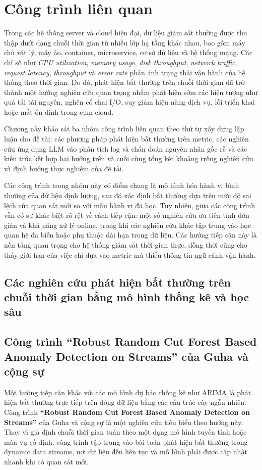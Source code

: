 \section{Công trình liên quan}
Trong các hệ thống server và cloud hiện đại, dữ liệu giám sát thường được thu thập dưới dạng chuỗi thời gian từ nhiều lớp hạ tầng khác nhau, bao gồm máy chủ vật lý, máy ảo, container, microservice, cơ sở dữ liệu và hệ thống mạng. Các chỉ số như \textit{CPU utilization}, \textit{memory usage}, \textit{disk throughput}, \textit{network traffic}, \textit{request latency}, \textit{throughput} và \textit{error rate} phản ánh trạng thái vận hành của hệ thống theo thời gian. Do đó, phát hiện bất thường trên chuỗi thời gian đã trở thành một hướng nghiên cứu quan trọng nhằm phát hiện sớm các hiện tượng như quá tải tài nguyên, nghẽn cổ chai I/O, suy giảm hiệu năng dịch vụ, lỗi triển khai hoặc mất ổn định trong cụm cloud.

Chương này khảo sát ba nhóm công trình liên quan theo thứ tự xây dựng lập luận cho đề tài: các phương pháp phát hiện bất thường trên metric, các nghiên cứu ứng dụng LLM vào phân tích log và chẩn đoán nguyên nhân gốc rễ và các kiến trúc kết hợp hai hướng trên và cuối cùng  tổng kết khoảng trống nghiên cứu và định hướng thực nghiệm của đề tài.

Các công trình trong nhóm này có điểm chung là mô hình hóa hành vi bình thường của dữ liệu định lượng, sau đó xác định bất thường dựa trên mức độ sai lệch của quan sát mới so với mẫu hành vi đã học. Tuy nhiên, giữa các công trình vẫn có sự khác biệt rõ rệt về cách tiếp cận: một số nghiên cứu ưu tiên tính đơn giản và khả năng xử lý online, trong khi các nghiên cứu khác tập trung vào học quan hệ đa biến hoặc phụ thuộc dài hạn trong dữ liệu. Các hướng tiếp cận này là nền tảng quan trọng cho hệ thống giám sát thời gian thực, đồng thời cũng cho thấy giới hạn của việc chỉ dựa vào metric mà thiếu thông tin ngữ cảnh vận hành.
\subsection{Các nghiên cứu phát hiện bất thường trên chuỗi thời gian bằng mô hình thống kê và học sâu}
\subsection*{Công trình “Robust Random Cut Forest Based Anomaly Detection on Streams” của Guha và cộng sự}
Một hướng tiếp cận khác với các mô hình dự báo thống kê như ARIMA là phát hiện bất thường trực tiếp trên dòng dữ liệu bằng các cấu trúc cây ngẫu nhiên. Công trình \textbf{“Robust Random Cut Forest Based Anomaly Detection on Streams”} của Guha và cộng sự là một nghiên cứu tiêu biểu theo hướng này. Thay vì giả định chuỗi thời gian tuân theo một dạng mô hình tuyến tính hoặc mùa vụ cố định, công trình tập trung vào bài toán phát hiện bất thường trong dynamic data streams, nơi dữ liệu đến liên tục và mô hình phải được cập nhật nhanh khi có quan sát mới.

